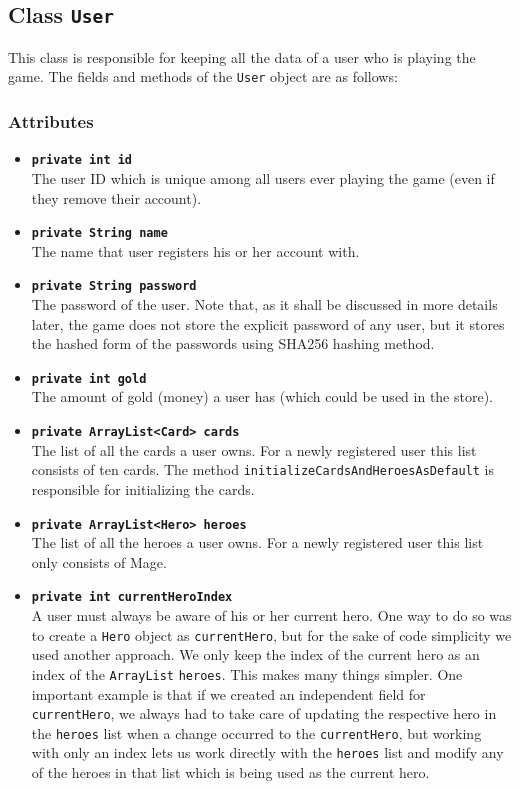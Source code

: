 \documentclass[a4paper]{article}
\begin{document}
\subsection{Class \texttt{User}}
This class is responsible for keeping all the data of a user who is playing the game. The fields and methods of the \texttt{User} object are as follows:

\subsubsection{Attributes}
\begin{itemize}
	\item \texttt{\textbf{private int id}}\\
	The user ID which is unique among all users ever playing the game (even if they remove their account).
	
	\item \texttt{\textbf{private String name}}\\
	The name that user registers his or her account with.
	
	\item \texttt{\textbf{private String password}}\\
	The password of the user. Note that, as it shall be discussed in more details later, the game does not store the explicit password of any user, but it stores the hashed form of the passwords using SHA256 hashing method.
	
	\item \texttt{\textbf{private int gold}}\\
	The amount of gold (money) a user has (which could be used in the store).
	
	\item \texttt{\textbf{private ArrayList<Card> cards}}\\
	The list of all the cards a user owns. For a newly registered user this list consists of ten cards. The method \texttt{initializeCardsAndHeroesAsDefault} is responsible for initializing the cards.
	
	\item \texttt{\textbf{private ArrayList<Hero> heroes}}\\
	The list of all the heroes a user owns. For a newly registered user this list only consists of Mage.
	
	\item \texttt{\textbf{private int currentHeroIndex}}\\
	A user must always be aware of his or her current hero. One way to do so was to create a \texttt{Hero} object as \texttt{currentHero}, but for the sake of code simplicity we used another approach. We only keep the index of the current hero as an index of the \texttt{ArrayList} \texttt{heroes}. This makes many things simpler. One important example is that if we created an independent field for \texttt{currentHero}, we always had to take care of updating the respective hero in the \texttt{heroes} list when a change occurred to the \texttt{currentHero}, but working with only an index lets us work directly with the \texttt{heroes} list and modify any of the heroes in that list which is being used as the current hero.
	

\end{itemize}
\end{document}
